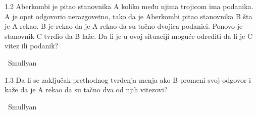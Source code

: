 \begin{isabellebody}
\begin{exercise}[subtitle=Raymond M. Smullyan: Logical Labyrinths]
%
\begin{isamarkuptext}%
1.2 Aberkombi je pitao 
          stanovnika A koliko među njima trojicom ima podanika. 
          A je opet odgovorio nerazgovetno,
          tako da je Aberkombi pitao stanovnika B šta je A rekao. 
          B je rekao da je A rekao da su tačno dvojica podanici. 
          Ponovo je stanovnik C tvrdio da B laže. 
          Da li je u ovoj situaciji moguće odrediti da li je C vitez ili podanik?%
\end{isamarkuptext}\isamarkuptrue%
\isamarkupfalse%
\ Smullyan{\isacharunderscore}{\kern0pt}{}{\isacharunderscore}{\kern0pt}{}{\isacharcolon}{\kern0pt}%
\isadelimproof
%
\endisadelimproof
%
\isatagproof
%
\endisatagproof
{\isafoldproof}%
%
\isadelimproof
%
\endisadelimproof
%
\begin{isamarkuptext}%
1.3 Da li se zaključak prethodnog tvrđenja menja ako B promeni svoj odgovor 
          i kaže da je A rekao da su tačno dva od njih vitezovi?%
\end{isamarkuptext}\isamarkuptrue%
\isamarkupfalse%
\ Smullyan{\isacharunderscore}{\kern0pt}{}{\isacharunderscore}{\kern0pt}{}{\isacharcolon}{\kern0pt}%
\isadelimproof
%
\endisadelimproof
%
\isatagproof
%
\endisatagproof
{\isafoldproof}%
%
\isadelimproof
%
\endisadelimproof
%
\end{exercise}
%
\isadelimtheory
%
\endisadelimtheory
%
\isatagtheory
%
\endisatagtheory
{\isafoldtheory}%
%
\isadelimtheory
%
\endisadelimtheory
%
\end{isabellebody}%
\endinput
